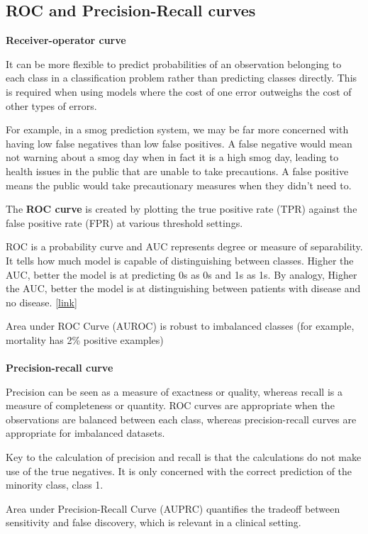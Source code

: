 \documentclass[12pt]{article}
\begin{document}
\subsection{ROC and Precision-Recall curves}
\textbf{Receiver-operator curve}
\par It can be more flexible to predict probabilities of an observation belonging to each class in a classification problem rather than predicting classes directly. This is required when using models where the cost of one error outweighs the cost of other types of errors.
\par For example, in a smog prediction system, we may be far more concerned with having low false negatives than low false positives. A false negative would mean not warning about a smog day when in fact it is a high smog day, leading to health issues in the public that are unable to take precautions. A false positive means the public would take precautionary measures when they didn’t need to.
\par The \textbf{ROC curve} is created by plotting the true positive rate (TPR) against the false positive rate (FPR) at various threshold settings.
\par ROC is a probability curve and AUC represents degree or measure of separability. It tells how much model is capable of distinguishing between classes. Higher the AUC, better the model is at predicting 0s as 0s and 1s as 1s. By analogy, Higher the AUC, better the model is at distinguishing between patients with disease and no disease. [\href{https://towardsdatascience.com/understanding-auc-roc-curve-68b2303cc9c5}{link}]
\par Area under ROC Curve (AUROC) is robust to imbalanced classes (for example, mortality has 2\% positive examples)
\\\\
\textbf{Precision-recall curve}
\par Precision can be seen as a measure of exactness or quality, whereas recall is a measure of completeness or quantity. ROC curves are appropriate when the observations are balanced between each class, whereas precision-recall curves are appropriate for imbalanced datasets.
\par Key to the calculation of precision and recall is that the calculations do not make use of the true negatives. It is only concerned with the correct prediction of the minority class, class 1.
\par Area under Precision-Recall Curve (AUPRC) quantifies the tradeoff between sensitivity and false discovery, which is relevant in a clinical setting.
\end{document}
